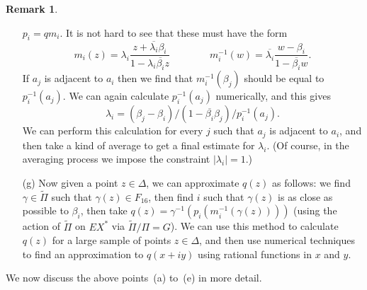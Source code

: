 \documentclass[reqno]{amsart}
\newcommand{\Dl}        {\Delta}
\newcommand{\bt}        {\beta}
\newcommand{\gm}        {\gamma}
\newcommand{\lm}        {\lambda}
\newcommand{\ov}[1]     {\overline{#1}}
\newcommand{\tPi}	{\widetilde{\Pi}}
\renewcommand{\:}{\colon}
\theoremstyle{definition}
\newtheorem{remark}[theorem]{Remark}
\begin{document}
\begin{remark}
\begin{itemize}
   $p_i=qm_i$.  It is not hard to see that these must have the form
   \[ m_i(z)=\lm_i\frac{z+\ov{\lm_i}\bt_i}{1-\lm_i\ov{\bt_i}z}
      \hspace{4em}
      m_i^{-1}(w) = \ov{\lm_i}\frac{w-\bt_i}{1-\ov{\bt_i}w}.
   \]
   If $a_j$ is adjacent to $a_i$ then we find that $m_i^{-1}(\bt_j)$
   should be equal to $p_i^{-1}(a_j)$.  We can again calculate
   $p_i^{-1}(a_j)$ numerically, and this gives
   \[ \lm_i = (\bt_j-\bt_i)/(1 - \ov{\bt_i}\bt_j)/p_i^{-1}(a_j). \]
   We can perform this calculation for every $j$ such that $a_j$ is
   adjacent to $a_i$, and then take a kind of average to get a final
   estimate for $\lm_i$.  (Of course, in the averaging process we
   impose the constraint $|\lm_i|=1$.)
  \item[(g)] Now given a point $z\in\Dl$, we can approximate $q(z)$ as
   follows: we find $\gm\in\tPi$ such that $\gm(z)\in F_{16}$, then
   find $i$ such that $\gm(z)$ is as close as possible to $\bt_i$,
   then take $q(z)=\gm^{-1}(p_i(m_i^{-1}(\gm(z))))$ (using the action
   of $\tPi$ on $EX^*$ via $\tPi/\Pi=G$).  We can use this method to
   calculate $q(z)$ for a large sample of points $z\in\Dl$, and then
   use numerical techniques to find an approximation to $q(x+iy)$ using
   rational functions in $x$ and $y$.
 \end{itemize}
\end{remark}

We now discuss the above points~(a) to~(e) in more detail.
\end{document}
